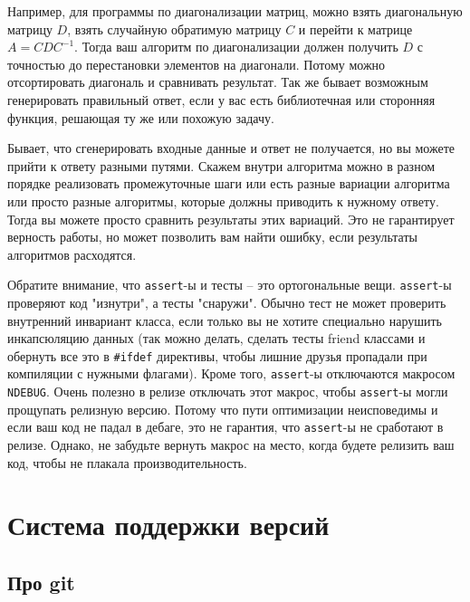 \documentclass{article}
\begin{document}
\begin{enumerate}
Например, для программы по диагонализации матриц, можно взять диагональную матрицу $D$, взять случайную обратимую матрицу $C$ и перейти к матрице $A = C D C^{-1}$. Тогда ваш алгоритм по диагонализации должен получить $D$ с точностью до перестановки элементов на диагонали. Потому можно отсортировать диагональ и сравнивать результат. Так же бывает возможным генерировать правильный ответ, если у вас есть библиотечная или сторонняя функция, решающая ту же или похожую задачу.

Бывает, что сгенерировать входные данные и ответ не получается, но вы можете прийти к ответу разными путями. Скажем внутри алгоритма можно в разном порядке реализовать промежуточные шаги или есть разные вариации алгоритма или просто разные алгоритмы, которые должны приводить к нужному ответу. Тогда вы можете просто сравнить результаты этих вариаций. Это не гарантирует верность работы, но может позволить вам найти ошибку, если результаты алгоритмов расходятся.
\end{enumerate}

Обратите внимание, что \verb"assert"-ы и тесты -- это ортогональные вещи. \verb"assert"-ы проверяют код "изнутри", а тесты "снаружи". Обычно тест не может проверить внутренний инвариант класса, если только вы не хотите специально нарушить инкапсюляцию данных (так можно делать, сделать тесты friend классами и обернуть все это в \verb"#ifdef" директивы, чтобы лишние друзья пропадали при компиляции с нужными флагами). Кроме того, \verb"assert"-ы отключаются макросом \verb"NDEBUG". Очень полезно в релизе отключать этот макрос, чтобы \verb"assert"-ы могли прощупать релизную версию. Потому что пути оптимизации неисповедимы и если ваш код не падал в дебаге, это не гарантия, что \verb"assert"-ы не сработают в релизе. Однако, не забудьте вернуть макрос на место, когда будете релизить ваш код, чтобы не плакала производительность.


\section{Система поддержки версий}

\subsection{Про git}
\end{document}
